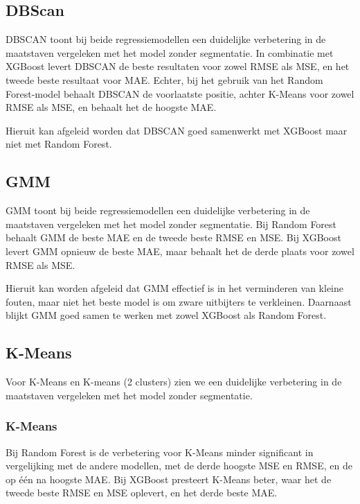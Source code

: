 \subsection*{DBScan}

DBSCAN toont bij beide regressiemodellen een duidelijke verbetering in de maatstaven vergeleken met het model zonder segmentatie. In combinatie met XGBoost levert DBSCAN de beste resultaten voor zowel RMSE als MSE, en het tweede beste resultaat voor MAE. Echter, bij het gebruik van het Random Forest-model behaalt DBSCAN de voorlaatste positie, achter K-Means voor zowel RMSE als MSE, en behaalt het de hoogste MAE.

\vspace{1em}

Hieruit kan afgeleid worden dat DBSCAN goed samenwerkt met XGBoost maar niet met Random Forest.

\subsection*{GMM}

GMM toont bij beide regressiemodellen een duidelijke verbetering in de maatstaven vergeleken met het model zonder segmentatie. Bij Random Forest behaalt GMM de beste MAE en de tweede beste RMSE en MSE. Bij XGBoost levert GMM opnieuw de beste MAE, maar behaalt het de derde plaats voor zowel RMSE als MSE.

\vspace{1em}

Hieruit kan worden afgeleid dat GMM effectief is in het verminderen van kleine fouten, maar niet het beste model is om zware uitbijters te verkleinen. Daarnaast blijkt GMM goed samen te werken met zowel XGBoost als Random Forest.

\newpage

\subsection*{K-Means}

Voor K-Means en K-means (2 clusters) zien we een duidelijke verbetering in de maatstaven vergeleken met het model zonder segmentatie.

\subsubsection*{K-Means}

Bij Random Forest is de verbetering voor K-Means minder significant in vergelijking met de andere modellen, met de derde hoogste MSE en RMSE, en de op één na hoogste MAE. Bij XGBoost presteert K-Means beter, waar het de tweede beste RMSE en MSE oplevert, en het derde beste MAE.

